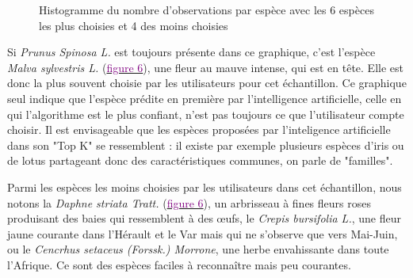 \documentclass[a4paper,12pt]{article}
\begin{document}
\vspace{-0.4cm}

\begin{figure}[H]
    \centering
    
    \caption{Histogramme du nombre d'observations par espèce avec les 6 espèces les plus choisies et 4 des moins choisies}
    \label{fig4}
\end{figure}

\vspace{0.2cm}

Si \textit{Prunus Spinosa L.} est toujours présente dans ce graphique, c'est l'espèce \textit{Malva sylvestris L.} (\hyperref[fig:malva]{\textcolor{purple}{figure 6}}), une fleur au mauve intense, qui est en tête. Elle est donc la plus souvent choisie par les utilisateurs pour cet échantillon. Ce graphique seul indique que l'espèce prédite en première par l'intelligence artificielle, celle en qui l'algorithme est le plus confiant, n'est pas toujours ce que l'utilisateur compte choisir. Il est envisageable que les espèces proposées par l'inteligence artificielle dans son "Top K" se ressemblent : il existe par exemple plusieurs espèces d'iris ou de lotus partageant donc des caractéristiques communes, on parle de "familles".

\vspace{0.2cm}

Parmi les espèces les moins choisies par les utilisateurs dans cet échantillon, nous notons la \textit{Daphne striata Tratt.} (\hyperref[fig:malva]{\textcolor{purple}{figure 6}}), un arbrisseau à fines fleurs roses produisant des baies qui ressemblent à des œufs, le \textit{Crepis bursifolia L.}, une fleur jaune courante dans l'Hérault et le Var mais qui ne s'observe que vers Mai-Juin, ou le \textit{Cencrhus setaceus (Forssk.) Morrone}, une herbe envahissante dans toute l'Afrique. Ce sont des espèces faciles à reconnaître mais peu courantes.
\end{document}

